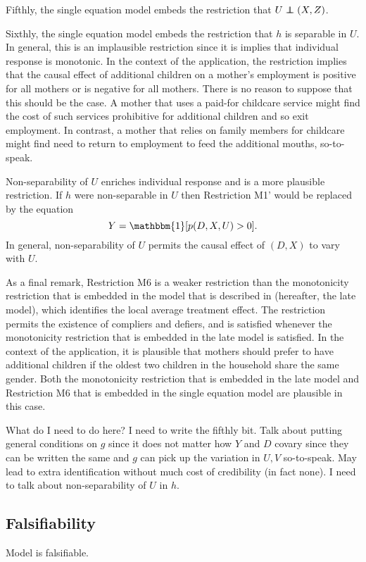 \documentclass[10pt,a4paper,twoside]{article}
\newcommand\independent{\protect\mathpalette{\protect\independenT}{\perp}}
\def\independenT#1#2{\mathrel{\rlap{$#1#2$}\mkern2mu{#1#2}}}
\numberwithin{equation}{section}
\begin{document}
Fifthly, the single equation model embeds the restriction that $U\independent (X,Z)$.

Sixthly, the single equation model embeds the restriction that $h$ is separable in $U$. In general, this is an implausible restriction since it is implies that individual response is monotonic. In the context of the application, the restriction implies that the causal effect of additional children on a mother's employment is positive for all mothers or is negative for all mothers. There is no reason to suppose that this should be the case. A mother that uses a paid-for childcare service might find the cost of such services prohibitive for additional children and so exit employment. In contrast, a mother that relies on family members for childcare might find need to return to employment to feed the additional mouths, so-to-speak. 



Non-separability of $U$ enriches individual response and is a more plausible restriction. If $h$ were non-separable in $U$ then Restriction M1' would be replaced by the equation
\[Y=\mathbbm{1}[p(D,X,U)>0].\]
In general, non-separability of $U$ permits the causal effect of $(D,X)$ to vary with $U$.   

As a final remark, Restriction M6 is a weaker restriction than the monotonicity restriction that is embedded in the model that is described in \cite{ai94} (hereafter, the late model), which identifies the local average treatment effect. The restriction permits the existence of compliers and defiers, and is satisfied whenever the monotonicity restriction that is embedded in the late model is satisfied. In the context of the application, it is plausible that mothers should prefer to have additional children if the oldest two children in the household share the same gender. Both the monotonicity restriction that is embedded in the late model and Restriction M6 that is embedded in the single equation model are plausible in this case. 

\color{red}What do I need to do here? I need to write the fifthly bit. Talk about putting general conditions on $g$ since it does not matter how $Y$ and $D$ covary since they can be written the same and $g$ can pick up the variation in $U,V$ so-to-speak. May lead to extra identification without much cost of credibility (in fact none). I need to talk about non-separability of $U$ in $h$.\color{black}
\subsection{Falsifiability}
Model is falsifiable.
\end{document}
